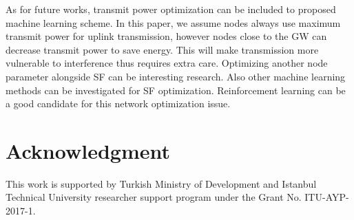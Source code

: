\documentclass[conference]{IEEEtran}
\begin{document}
\par As for future works, transmit power optimization can be included to proposed machine learning scheme. In this paper, we assume nodes always use maximum transmit power for uplink transmission, however nodes close to the GW can decrease transmit power to save energy. This will make transmission more vulnerable to interference thus requires extra care. Optimizing another node parameter alongside SF can be interesting research. Also other machine learning methods can be investigated for SF optimization. Reinforcement learning can be a good candidate for this network optimization issue.


\section*{Acknowledgment}
\par This work is supported by Turkish Ministry of Development and Istanbul Technical University researcher support program under the Grant No. ITU-AYP-2017-1.




\end{document}
